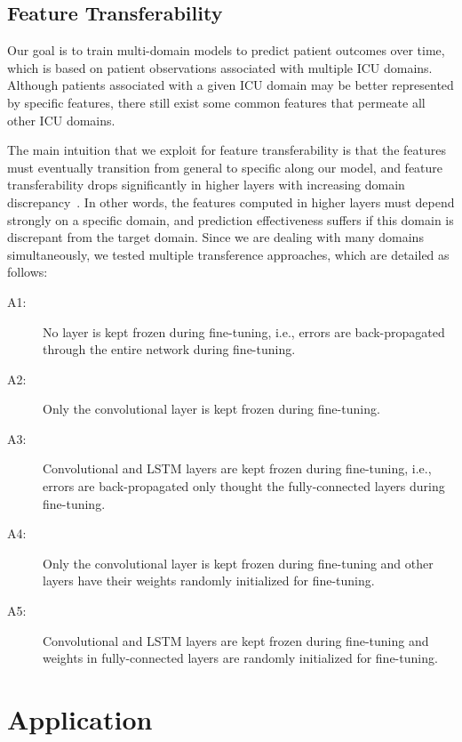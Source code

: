 \subsection{Feature Transferability}

Our goal is to train multi-domain models to predict patient outcomes over time, which is based on patient observations associated with multiple ICU domains. Although patients associated with a given ICU domain may be better represented by specific features, there still exist some common features that permeate all other ICU domains. 

The main intuition that we exploit for feature transferability is that the features must eventually transition from general to specific along our model, and feature transferability drops significantly in higher layers with increasing domain discrepancy~\citep{bengio2}. In other words, the features computed in higher layers must depend %
strongly on a specific domain, and prediction effectiveness suffers if this domain is discrepant from the target domain. Since we are dealing with many domains simultaneously, we tested multiple transference approaches, which are detailed as follows:

\begin{description}
\item [A1:] No layer is kept frozen during fine-tuning, i.e., errors are back-propagated through the entire network during fine-tuning.
\item [A2:] Only the convolutional layer is kept frozen during fine-tuning.
\item [A3:] Convolutional and LSTM layers are kept frozen during fine-tuning, i.e., errors are back-propagated only thought the fully-connected layers during fine-tuning.
\item [A4:] Only the convolutional layer is kept frozen during fine-tuning and other layers have their weights randomly initialized for fine-tuning.
\item [A5:] Convolutional and LSTM layers are kept frozen during fine-tuning and weights in fully-connected layers are randomly initialized for fine-tuning.
\end{description}


\section{Application}

